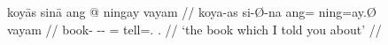 \begin{figure}
\ex\label{ex:relc_siintcase}
\begin{minipage}[t]{.5\remaining}
\begingl
	\gla koyās sinā ang @ ningay vayam //
	\glb koya-as si-Ø-na ang= ning=ay.Ø vayam //
	\glc book-\Parg{} \Rel{}-\Parg{}-\Gen{} \AgtT{}= tell=\Fsg{}.\Top{} 
		\Second{}.\Dat{} //
	\glft `the book which I told you about' //
\endgl
\medskip
\vspace{2em}
\end{minipage}
\end{figure}
